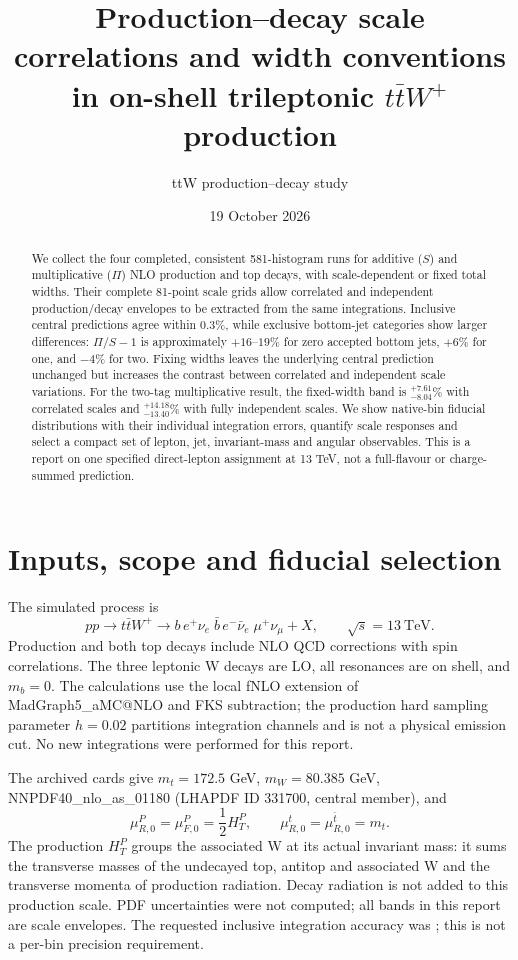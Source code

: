 \documentclass[11pt,a4paper]{article}
\title{Production--decay scale correlations and width conventions\\
in on-shell trileptonic $t\bar tW^+$ production}
\author{ttW production--decay study}
\date{19 October 2026}
\newcommand{\code}[1]{\texttt{\detokenize{#1}}}
\begin{document}
\maketitle
\begin{abstract}
We collect the four completed, consistent 581-histogram runs for additive
($S$) and multiplicative ($\Pi$) NLO production and top decays, with
scale-dependent or fixed total widths. Their complete 81-point scale grids
allow correlated and independent production/decay envelopes to be extracted
from the same integrations. Inclusive central predictions agree within
0.3\%, while exclusive bottom-jet categories show larger differences:
$\Pi/S-1$ is approximately $+16$--$19$\% for zero accepted bottom jets,
$+6$\% for one, and $-4$\% for two. Fixing widths leaves the underlying
central prediction unchanged but increases the contrast between correlated
and independent scale variations. For the two-tag multiplicative result,
the fixed-width band is $^{+7.61}_{-8.04}$\% with correlated scales and
$^{+14.18}_{-13.40}$\% with fully independent scales. We show native-bin
fiducial distributions with their individual integration errors, quantify
scale responses and select a compact set of lepton, jet, invariant-mass and
angular observables. This is a report on one specified direct-lepton
assignment at 13 TeV, not a full-flavour or charge-summed prediction.
\end{abstract}

\section{Inputs, scope and fiducial selection}
The simulated process is
\begin{equation}
 pp\to t\bar t W^+\to
 b\,e^+\nu_e\;\bar b\,e^-\bar\nu_e\;\mu^+\nu_\mu+X,
 \qquad \sqrt{s}=13~\mathrm{TeV}.
\end{equation}
Production and both top decays include NLO QCD corrections with spin
correlations. The three leptonic W decays are LO, all resonances are on
shell, and $m_b=0$. The calculations use the local fNLO extension of
MadGraph5\_aMC@NLO and FKS subtraction\cite{MG5,MadFKS}; the production hard
sampling parameter $h=0.02$ partitions integration channels and is not a
physical emission cut. No new integrations were performed for this report.

The archived cards give
$m_t=172.5$ GeV, $m_W=80.385$ GeV, NNPDF40\_nlo\_as\_01180 (LHAPDF ID
331700, central member), and
\begin{equation}
 \mu_{R,0}^{P}=\mu_{F,0}^{P}=\frac12 H_T^{P},\qquad
 \mu_{R,0}^{t}=\mu_{R,0}^{\bar t}=m_t.
\end{equation}
The production $H_T^P$ groups the associated W at its actual invariant mass:
it sums the transverse masses of the undecayed top, antitop and associated
W and the transverse momenta of production radiation. Decay radiation is
not added to this production scale. PDF uncertainties were not computed;
all bands in this report are scale envelopes. The requested inclusive
integration accuracy was \code{req_acc_FO=0.002}; this is not a per-bin
precision requirement.
\end{document}
